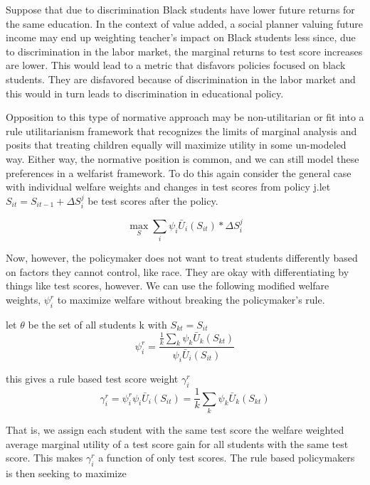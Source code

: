 \documentclass{article}
\theoremstyle{definition}
\theoremstyle{definition}
\theoremstyle{definition}
\begin{document}
Suppose that due to discrimination Black students have lower future returns for the same education. In the context of value added, a social planner valuing future income may end up weighting teacher's impact on Black students less since, due to discrimination in the labor market, the marginal returns to test score increases are lower. This would lead to a metric that disfavors policies focused on black students. They are disfavored because of discrimination in the labor market and this would in turn leads to discrimination in educational policy. 

Opposition to this type of normative approach may be non-utilitarian or fit into a rule utilitarianism framework that recognizes the limits of marginal analysis and posits that treating children equally will maximize utility in some un-modeled way. Either way, the normative position is common, and we can still model these preferences in a welfarist framework. To do this again consider the general case with individual welfare weights and changes in test scores from policy j.let $ S_{it} = S_{it-1} + \Delta S_i^j$ be test scores after the policy. 

\begin{equation}
 \max_S \sum_i \psi_i \bar{U}_{i}(S_{it}) * \Delta S_i^j
\end{equation}

Now, however, the policymaker does not want to treat students differently based on factors they cannot control, like race. They are okay with differentiating by things like test scores, however. We can use the following modified welfare weights, $\psi_i^r$ to maximize welfare without breaking the policymaker's rule. 

\begin{definition}
let $\theta$ be the set of all students k with $S_{kt} = S_{it}$
\begin{equation}
 \psi_i^r = \frac{\frac{1}{k} \sum_k \psi_k\bar{U}_{k}(S_{kt})}{\psi_i\bar{U}_{i}(S_{it})}
\end{equation}

this gives a rule based test score weight $\gamma_i^r$
\begin{equation}
    \gamma_i^r = \psi_i^r \psi_i \bar{U}_{i}(S_{it}) = \frac{1}{k} \sum_k \psi_k\bar{U}_{k}(S_{kt})
\end{equation}
\end{definition}

That is, we assign each student with the same test score the welfare weighted average marginal utility of a test score gain for all students with the same test score. This makes $\gamma_i^r$ a function of only test scores. The rule based policymakers is then seeking to maximize 
\end{document}
